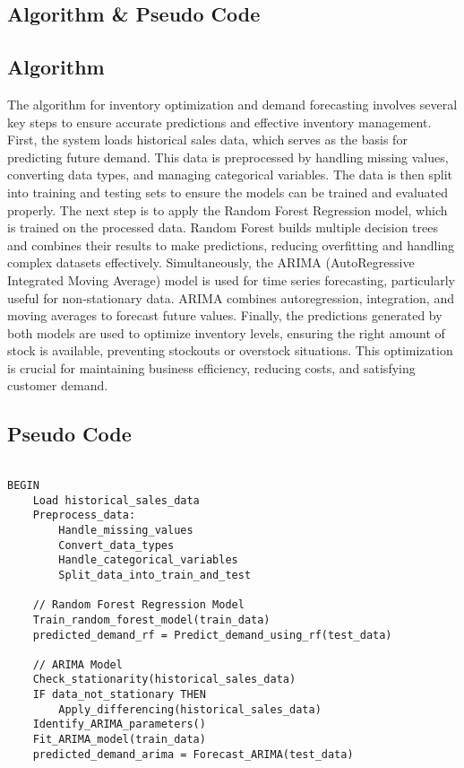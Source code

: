 \documentclass[10pt]{report}
\begin{document}
\begin{center}
\section{Algorithm \& Pseudo Code}

\subsection{Algorithm}
The algorithm for inventory optimization and demand forecasting involves several key steps to ensure accurate predictions and effective inventory management. First, the system loads historical sales data, which serves as the basis for predicting future demand. This data is preprocessed by handling missing values, converting data types, and managing categorical variables. The data is then split into training and testing sets to ensure the models can be trained and evaluated properly. The next step is to apply the Random Forest Regression model, which is trained on the processed data. Random Forest builds multiple decision trees and combines their results to make predictions, reducing overfitting and handling complex datasets effectively. Simultaneously, the ARIMA (AutoRegressive Integrated Moving Average) model is used for time series forecasting, particularly useful for non-stationary data. ARIMA combines autoregression, integration, and moving averages to forecast future values. Finally, the predictions generated by both models are used to optimize inventory levels, ensuring the right amount of stock is available, preventing stockouts or overstock situations. This optimization is crucial for maintaining business efficiency, reducing costs, and satisfying customer demand.

\subsection{Pseudo Code}
\begin{verbatim}

BEGIN
    Load historical_sales_data
    Preprocess_data:
        Handle_missing_values
        Convert_data_types
        Handle_categorical_variables
        Split_data_into_train_and_test
    
    // Random Forest Regression Model
    Train_random_forest_model(train_data)
    predicted_demand_rf = Predict_demand_using_rf(test_data)
    
    // ARIMA Model
    Check_stationarity(historical_sales_data)
    IF data_not_stationary THEN
        Apply_differencing(historical_sales_data)
    Identify_ARIMA_parameters()
    Fit_ARIMA_model(train_data)
    predicted_demand_arima = Forecast_ARIMA(test_data)
    

\end{verbatim}
\end{center}
\end{document}
